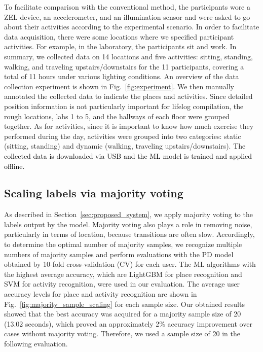 \documentclass[conference]{IEEEtran}
\newcommand{\add}[1]{\textcolor{black}{#1}}	%
\newcommand{\erase}[1]{\if0{#1}\fi}	%
\begin{document}
To facilitate comparison\erase{s} with the conventional method, the participants wore a ZEL device, an accelerometer, and an illumination sensor and were asked to go about their activities according to the experimental scenario.
In order to facilitate data acquisition, there were some locations where we specified participant activities.
For example, in the laboratory, the participants sit and work.
In summary, we collected data on 14 locations and five activities: sitting, standing, walking, and traveling upstairs/downstairs for the 11 participants\add{,} covering a total of 11 hours under various lighting conditions.
An overview of the data collection experiment is shown in Fig.~\ref{fig:experiment}.
We then manually annotated the collected data to indicate the places and activities.
Since detailed position information is not particularly important for lifelog compilation, \add{the} rough locations, labs 1 to 5, and the hallways of each floor were grouped together.
As for activities, since it is important to know how much exercise they performed during the day, activities were grouped into two categories: static (sitting, standing) and dynamic (walking, traveling upstairs/downstairs).
\add{
The collected data is downloaded via USB and the ML model is trained and applied offline.
}

\subsection{Scaling labels via majority voting}
As described in Section~\ref{sec:proposed_system}, we apply majority voting to the labels output by the model.
Majority voting also plays a role in removing noise, particularly in terms of location, because transitions are often slow.
Accordingly, \erase{in order} to determine the optimal number of majority samples, we recognize multiple numbers of majority samples and perform evaluations with the PD model obtained by 10-fold cross-validation (CV) for each user.
The ML algorithms with the highest average accuracy, which are LightGBM for place recognition and SVM for activity recognition, were used in our evaluation\erase{s}.
The average user accuracy levels for place and activity recognition are shown in Fig.~\ref{fig:majority_sample_scaling} for each sample size.
Our obtained results showed that the best accuracy was acquired for a majority sample size of 20 (13.02 seconds), which proved an approximately 2\% accuracy improvement over cases without majority voting.
Therefore, we used a sample size of 20 in the following evaluation.
\end{document}
